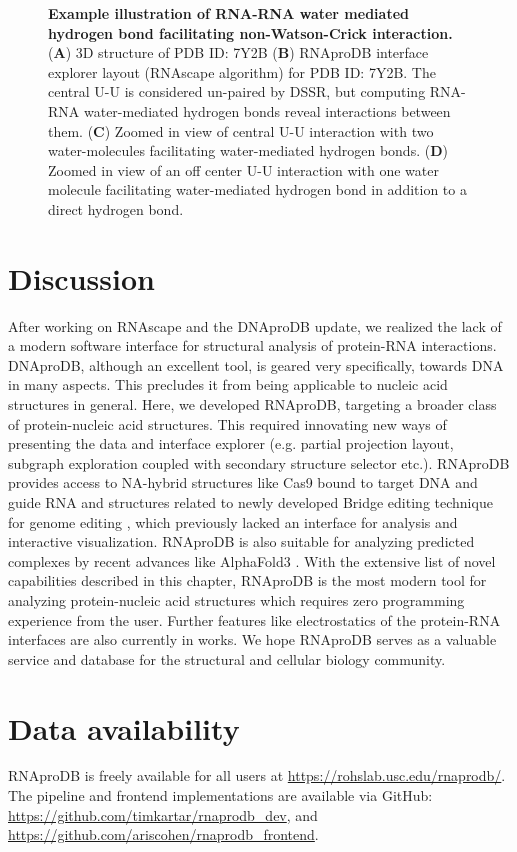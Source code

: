 \begin{center}
    \begin{figure}
        \caption[Example illustration of RNA-RNA water mediated hydrogen bond facilitating non-Watson-Crick interaction.]{\textbf{Example illustration of RNA-RNA water mediated hydrogen bond facilitating non-Watson-Crick interaction.} ({\bf A}) 3D structure of PDB ID: 7Y2B  ({\bf B}) RNAproDB interface explorer layout (RNAscape algorithm) for PDB ID: 7Y2B. The central U-U is considered un-paired by DSSR, but computing RNA-RNA water-mediated hydrogen bonds reveal interactions between them. ({\bf C}) Zoomed in view of central U-U interaction with two water-molecules facilitating water-mediated hydrogen bonds. ({\bf D}) Zoomed in view of an off center U-U interaction with one water molecule facilitating water-mediated hydrogen bond in addition to a direct hydrogen bond.}
  \label{fig:rnaprodb3}
\end{figure}
\end{center}

\section{Discussion}

After working on RNAscape \citep{Mitra2024rnascape} and the DNAproDB \citep{Sagendorf2017, Sagendorf2020} update, we realized the lack of a modern software interface for structural analysis of protein-RNA interactions. DNAproDB, although an excellent tool, is geared very specifically, towards DNA in many aspects. This precludes it from being applicable to nucleic acid structures in general. Here, we developed RNAproDB, targeting a broader class of protein-nucleic acid structures. This required innovating new ways of presenting the data and interface explorer (e.g. partial projection layout, subgraph exploration coupled with secondary structure selector etc.). RNAproDB provides access to NA-hybrid structures like Cas9 bound to target DNA and guide RNA \citep{nishimasu2014crystal,} and structures related to newly developed Bridge editing technique for genome editing \citep{durrant2024bridge}, which previously lacked an interface for analysis and interactive visualization. RNAproDB is also suitable for analyzing predicted complexes by recent advances like AlphaFold3 \citep{Abramson2024}. With the extensive list of novel capabilities described in this chapter, RNAproDB is the most modern tool for analyzing protein-nucleic acid structures which requires zero programming experience from the user. Further features like electrostatics of the protein-RNA interfaces are also currently in works. We hope RNAproDB serves as a valuable service and database for the structural and cellular biology community.

\section{Data availability}
RNAproDB is freely available for all users at \url{https://rohslab.usc.edu/rnaprodb/}.
The pipeline and frontend implementations are available via GitHub:
\url{https://github.com/timkartar/rnaprodb_dev}, and
\url{https://github.com/ariscohen/rnaprodb_frontend}.
